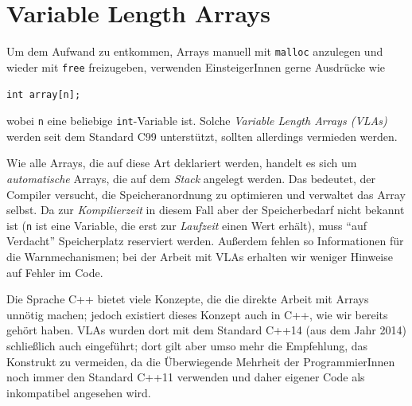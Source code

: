 \section{Variable Length Arrays}
Um dem Aufwand zu entkommen, Arrays manuell mit \texttt{malloc} anzulegen und wieder mit \texttt{free} freizugeben, verwenden EinsteigerInnen gerne Ausdrücke wie
\begin{center}
\texttt{int array[n];}
\end{center}
wobei \texttt{n} eine beliebige \texttt{int}-Variable ist. Solche \emph{Variable Length Arrays (VLAs)} werden seit dem Standard C99 unterstützt, sollten allerdings vermieden werden.

Wie alle Arrays, die auf diese Art deklariert werden, handelt es sich um \emph{automatische} Arrays, die auf dem \emph{Stack} angelegt werden. Das bedeutet, der Compiler versucht, die Speicheranordnung zu optimieren und verwaltet das Array selbst. Da zur \emph{Kompilierzeit} in diesem Fall aber der Speicherbedarf nicht bekannt ist (\texttt{n} ist eine Variable, die erst zur \emph{Laufzeit} einen Wert erhält), muss \enquote{auf Verdacht} Speicherplatz reserviert werden. Außerdem fehlen so Informationen für die Warnmechanismen; \ie bei der Arbeit mit VLAs erhalten wir weniger Hinweise auf Fehler im Code.

\begin{plusbox}
Die Sprache C++ bietet viele Konzepte, die die direkte Arbeit mit Arrays unnötig machen; jedoch existiert dieses Konzept auch in C++, wie wir bereits
gehört haben. VLAs wurden dort mit dem Standard C++14 (aus dem Jahr 2014) schließlich auch eingeführt; dort gilt aber umso mehr die Empfehlung, das Konstrukt zu vermeiden, da die Überwiegende Mehrheit der ProgrammierInnen noch immer den Standard C++11 verwenden und daher eigener Code als inkompatibel angesehen wird.
\end{plusbox}
